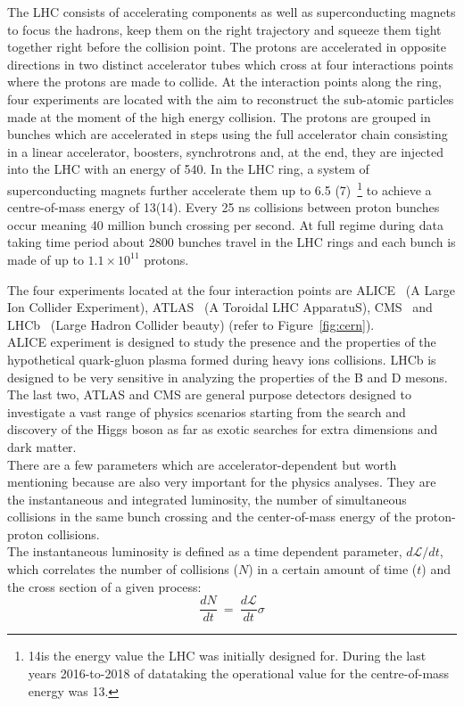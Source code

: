 The LHC consists of accelerating components as well as
superconducting magnets to focus the hadrons, keep them on the right
trajectory and squeeze them tight together right before the
collision point. 
The protons are accelerated in opposite directions in two distinct
accelerator tubes which cross at four interactions points where the
protons are made to collide. At the interaction points along the ring,
four experiments are located with the aim to reconstruct the
sub-atomic particles made at the moment of the high energy collision.
The protons are grouped in bunches which are
accelerated in steps using the full accelerator chain consisting in a linear
accelerator, boosters, synchrotrons and, at the end, they are injected
into the LHC with an energy of 540\GeV. In the LHC ring, a system of
superconducting magnets further accelerate them up to 6.5\TeV
(7\TeV)~\footnote{14\TeV is the energy value the LHC was initially designed for. During the last years
  2016-to-2018 of datataking the operational value for the centre-of-mass energy was 13\TeV.}
to achieve a centre-of-mass energy of 13\TeV (14\TeV). Every
25 ns collisions between proton bunches occur meaning 40 million
bunch crossing per second. At full regime during data taking time
period about 2800 bunches travel in the LHC rings and each bunch is
made of up to $1.1\times10^{11}$ protons.

The four experiments located at the four interaction points are
ALICE~\cite{alice_2008} (A Large Ion Collider Experiment),
ATLAS~\cite{atlas_2008} (A Toroidal LHC ApparatuS),
CMS~\cite{cms_2008} and LHCb~\cite{lhcb_2008} (Large Hadron Collider
beauty) (refer to Figure~\ref{fig:cern}).\\
 ALICE experiment is designed
to study the presence and the properties of the hypothetical
quark-gluon plasma formed during heavy ions collisions. LHCb is
designed to be very sensitive in analyzing the properties of the B and D
mesons. The last two, ATLAS and CMS are general purpose detectors
designed to investigate a vast range of physics scenarios starting
from the search and discovery of the Higgs boson as far as exotic
searches for extra dimensions
and dark matter. \\

There are a few parameters which are accelerator-dependent but worth
mentioning because are also very important for the
physics analyses. They are the instantaneous and integrated luminosity, the
number of simultaneous collisions in the same bunch crossing and the
center-of-mass energy of the proton-proton collisions.\\
The instantaneous luminosity is defined as a time dependent
parameter, $d\mathcal{L}/dt$, which correlates the number of collisions
($N$) in a certain amount of time ($t$) and the cross section of a
given process:
\begin{equation}
\label{eq:instalumi}
\frac{dN}{dt} \: = \: \frac{d\mathcal{L}}{dt}\sigma
\end{equation}

